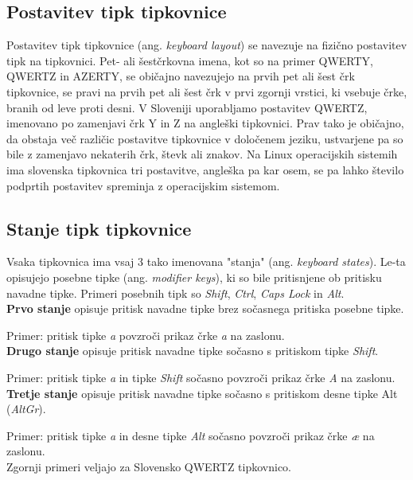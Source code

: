 

    \subsection{Postavitev tipk tipkovnice}\label{subsec:postavitev-tipk-tipkovnice}

    Postavitev tipk tipkovnice (ang. \emph{keyboard layout}) se navezuje na fizično postavitev tipk na tipkovnici.
    Pet- ali šestčrkovna imena, kot so na primer QWERTY, QWERTZ in AZERTY, se običajno navezujejo na prvih pet ali šest črk tipkovnice,
    se pravi na prvih pet ali šest črk v prvi zgornji vrstici, ki vsebuje črke, branih od leve proti desni.
    V Sloveniji uporabljamo postavitev QWERTZ, imenovano po zamenjavi črk Y in Z na angleški tipkovnici.
    Prav tako je običajno, da obstaja več različic postavitve tipkovnice v določenem jeziku, ustvarjene pa so bile z zamenjavo nekaterih črk, števk ali znakov.
    Na Linux operacijskih sistemih ima slovenska tipkovnica tri postavitve, angleška pa kar osem,
    se pa lahko število podprtih postavitev spreminja z operacijskim sistemom.

    \subsection{Stanje tipk tipkovnice}\label{subsec:stanje-tipk-tipkovnice}

    Vsaka tipkovnica ima vsaj 3 tako imenovana "stanja" (ang. \emph{keyboard states}).
    Le-ta opisujejo posebne tipke (ang. \emph{modifier keys}), ki so bile pritisnjene ob pritisku navadne tipke.
    Primeri posebnih tipk so \emph{Shift}, \emph{Ctrl}, \emph{Caps Lock} in \emph{Alt}. \\

    \textbf{Prvo stanje} opisuje pritisk navadne tipke brez sočasnega pritiska posebne tipke.

    Primer: pritisk tipke \emph{a} povzroči prikaz črke \emph{a} na zaslonu. \\

    \textbf{Drugo stanje} opisuje pritisk navadne tipke sočasno s pritiskom tipke \emph{Shift}.

    Primer: pritisk tipke \emph{a} in tipke \emph{Shift} sočasno povzroči prikaz črke \emph{A} na zaslonu. \\

    \textbf{Tretje stanje} opisuje pritisk navadne tipke sočasno s pritiskom desne tipke Alt (\emph{AltGr}).

    Primer: pritisk tipke \emph{a} in desne tipke \emph{Alt} sočasno povzroči prikaz črke \emph{æ} na zaslonu. \\

    Zgornji primeri veljajo za Slovensko QWERTZ tipkovnico.

